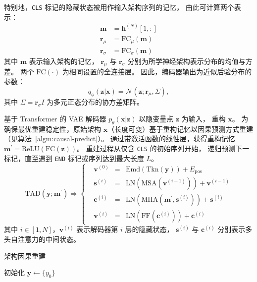 \documentclass[../main.tex]{subfiles}
\begin{document}
特别地，\texttt{CLS} 标记的隐藏状态被用作输入架构序列的记忆，
由此可计算两个表示：
\begin{align}
	\bm{m}          & = \bm{h}^{(N)}[1,:]            \\
	\bm{r}_{\mu}    & = \mathrm{FC}_{\mu}(\bm{m})    \\
	\bm{r}_{\sigma} & = \mathrm{FC}_{\sigma}(\bm{m})
\end{align}
其中 $ \bm{m} $ 表示输入架构的记忆，
$ \bm{r}_{\mu} $ 与 $ \bm{r}_{\sigma} $ 分别为所学神经架构表示分布的均值与方差。
两个 $ \mathrm{FC}(\cdot) $ 为相同设置的全连接层。
因此，编码器输出为近似后验分布的参数：
\begin{equation}
	q_\phi(\bm{z}|\bm{x}) = \mathcal{N}(\bm{z};\bm{r}_\mu,\varSigma),
\end{equation}
其中 $ \varSigma = \bm{r}_{\sigma}I $ 为多元正态分布的协方差矩阵。


基于 Transformer 的 VAE 解码器 $ p_{\theta}(\bm{x}|\bm{z}) $ 以隐变量点 $ \bm{z} $ 为输入，
重构 $ \bm{x} $。
为确保最优重建稳定性，原始架构 $ \bm{x} $（长度可变）基于重构记忆以因果预测方式重建（见算法~\ref{algm:causal-predict}）。
通过带激活函数的线性层，获得重构记忆 $ \bm{m}^\prime = \mathrm{ReLU}(\mathrm{FC}(\bm{z})) $。
重建过程从仅含 \texttt{CLS} 的初始序列开始，
递归预测下一标记，直至遇到 \texttt{END} 标记或序列达到最大长度 $ L $。
\begin{equation}
	\mathrm{TAD}(\bm{y};\bm{m}^\prime)\Rightarrow\left\{
	\begin{alignedat}{2}
		 & \bm{v}^{(0)} & = {} & \mathrm{Emd} (\mathrm{Tkn} (\bm{y})) + E_\mathrm{pos}                   \\
		 & \bm{s}^{(i)} & = {} & \mathrm{LN} (\mathrm{MSA} (\bm{v}^{(i-1)})) + \bm{v}^{(i-1)}            \\
		 & \bm{c}^{(i)} & = {} & \mathrm{LN} (\mathrm{MHA} (\bm{m}^\prime, \bm{s}^{(i)})) + \bm{s}^{(i)} \\
		 & \bm{v}^{(i)} & = {} & \mathrm{LN} (\mathrm{FF} (\bm{c}^{(i)})) + \bm{c}^{(i)}
	\end{alignedat}\right.
\end{equation}
其中 $ i \in [1,N] $，$ \bm{v}^{(i)} $ 表示解码器第 $ i $ 层的隐藏状态，
$ \bm{s}^{(i)} $ 与 $ \bm{c}^{(i)} $ 分别表示多头自注意力的中间状态。

\begin{algorithm}[t]
	\caption{架构因果重建}\label{algm:causal-predict}
	\SetAlgoLined{}
	\BlankLine
	初始化 $ \bm{y} \gets \{y_0\} $\;
	\BlankLine
	\BlankLine
	\;
\end{algorithm}
\end{document}
